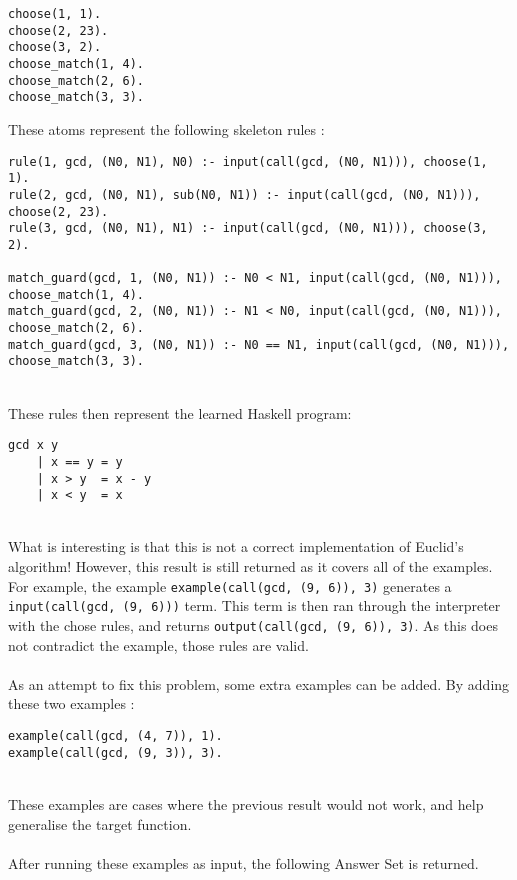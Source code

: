 \begin{multicols}{2}
\begin{lstlisting}
choose(1, 1).
choose(2, 23).
choose(3, 2).
choose_match(1, 4).
choose_match(2, 6).
choose_match(3, 3).
\end{lstlisting}
\end{multicols}
These atoms represent the following skeleton rules : \\

\begin{lstlisting}
rule(1, gcd, (N0, N1), N0) :- input(call(gcd, (N0, N1))), choose(1, 1).
rule(2, gcd, (N0, N1), sub(N0, N1)) :- input(call(gcd, (N0, N1))), choose(2, 23).
rule(3, gcd, (N0, N1), N1) :- input(call(gcd, (N0, N1))), choose(3, 2).

match_guard(gcd, 1, (N0, N1)) :- N0 < N1, input(call(gcd, (N0, N1))), choose_match(1, 4).
match_guard(gcd, 2, (N0, N1)) :- N1 < N0, input(call(gcd, (N0, N1))), choose_match(2, 6).
match_guard(gcd, 3, (N0, N1)) :- N0 == N1, input(call(gcd, (N0, N1))), choose_match(3, 3).
\end{lstlisting}
\mbox{}\\
These rules then represent the learned Haskell program: \\

\begin{lstlisting}
gcd x y
	| x == y = y
	| x > y  = x - y
	| x < y  = x
\end{lstlisting}
\mbox{}\\
What is interesting is that this is not a correct implementation of Euclid's algorithm! However, this result is still returned as it covers all of the examples. For example, the example \lstinline{example(call(gcd, (9, 6)), 3)} generates a \lstinline{input(call(gcd, (9, 6)))} term. This term is then ran through the interpreter with the chose rules, and returns \lstinline{output(call(gcd, (9, 6)), 3)}. As this does not contradict the example, those rules are valid. \\ \\%
As an attempt to fix this problem, some extra examples can be added. By adding these two examples :\\

\begin{lstlisting}
example(call(gcd, (4, 7)), 1).
example(call(gcd, (9, 3)), 3).
\end{lstlisting}
\mbox{}\\
These examples are cases where the previous result would not work, and help generalise the target function. \\ \\
After running these examples as input, the following Answer Set is returned. \\

